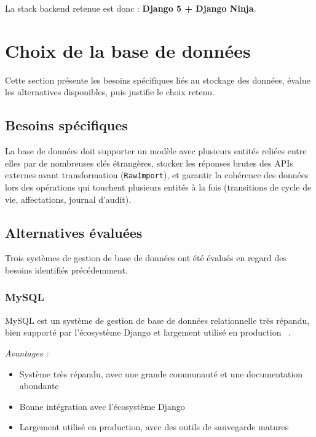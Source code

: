 \medskip
\noindent La stack backend retenue est donc :
\textbf{Django 5 + Django Ninja}.

\section{Choix de la base de données}

Cette section présente les besoins spécifiques liés au stockage des données,
évalue les alternatives disponibles, puis justifie le choix retenu.

\subsection{Besoins spécifiques}

La base de données doit supporter un modèle avec plusieurs entités reliées
entre elles par de nombreuses clés étrangères, stocker les réponses brutes
des APIs externes avant transformation (\texttt{RawImport}), et garantir
la cohérence des données lors des opérations qui touchent plusieurs entités
à la fois (transitions de cycle de vie, affectations, journal d'audit).

\subsection{Alternatives évaluées}

Trois systèmes de gestion de base de données ont été évalués en regard
des besoins identifiés précédemment.

\subsubsection{MySQL}

MySQL est un système de gestion de base de données relationnelle très répandu,
bien supporté par l'écosystème Django et largement utilisé en
production ~\cite{mysql_dev}.

\textit{Avantages :}
\begin{itemize}
  \item Système très répandu, avec une grande communauté et une documentation abondante
  \item Bonne intégration avec l'écosystème Django
  \item Largement utilisé en production, avec des outils de sauvegarde matures
\end{itemize}

